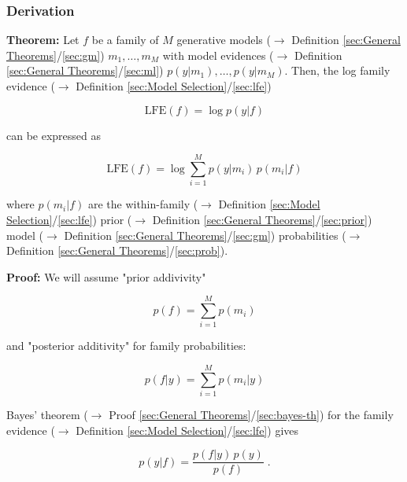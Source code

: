 \documentclass[a4paper,12pt,twoside]{book}
\begin{document}
\subsubsection[\textbf{Derivation}]{Derivation} \label{sec:lfe-der}
\setcounter{equation}{0}

\textbf{Theorem:} Let $f$ be a family of $M$ generative models ($\rightarrow$ Definition \ref{sec:General Theorems}/\ref{sec:gm}) $m_1, \ldots, m_M$ with model evidences ($\rightarrow$ Definition \ref{sec:General Theorems}/\ref{sec:ml}) $p(y \vert m_1), \ldots, p(y \vert m_M)$. Then, the log family evidence ($\rightarrow$ Definition \ref{sec:Model Selection}/\ref{sec:lfe})

\begin{equation} \label{eq:lfe-der-LFE-term}
\mathrm{LFE}(f) = \log p(y|f)
\end{equation}

can be expressed as

\begin{equation} \label{eq:lfe-der-LFE-marg}
\mathrm{LFE}(f) = \log \sum_{i=1}^M p(y|m_i) \, p(m_i|f)
\end{equation}

where $p(m_i \vert f)$ are the within-family ($\rightarrow$ Definition \ref{sec:Model Selection}/\ref{sec:lfe}) prior ($\rightarrow$ Definition \ref{sec:General Theorems}/\ref{sec:prior}) model ($\rightarrow$ Definition \ref{sec:General Theorems}/\ref{sec:gm}) probabilities ($\rightarrow$ Definition \ref{sec:General Theorems}/\ref{sec:prob}).


\vspace{1em}
\textbf{Proof:} We will assume "prior addivivity"

\begin{equation} \label{eq:lfe-der-fam-prior}
p(f) = \sum_{i=1}^M p(m_i)
\end{equation}

and "posterior additivity" for family probabilities:

\begin{equation} \label{eq:lfe-der-fam-post}
p(f|y) = \sum_{i=1}^M p(m_i|y)
\end{equation}

Bayes' theorem ($\rightarrow$ Proof \ref{sec:General Theorems}/\ref{sec:bayes-th}) for the family evidence ($\rightarrow$ Definition \ref{sec:Model Selection}/\ref{sec:lfe}) gives

\begin{equation} \label{eq:lfe-der-fe-bayes-th}
p(y|f) = \frac{p(f|y) \, p(y)}{p(f)} \; .
\end{equation}
\end{document}
